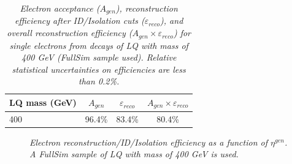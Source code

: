 %
\begin{table}[htb]
  \label{tab:ElecEffAcc}
  \begin{center}
    \begin{tabular}{|l|c|c|c|} \hline
      LQ mass (GeV) & $A_{gen}$ & $\varepsilon_{reco}$ & $A_{gen} \times \varepsilon_{reco}$\\ \hline
      400 & 96.4\% & 83.4\% & 80.4\% \\ \hline
    \end{tabular}
    \caption{\small \sl Electron acceptance ($A_{gen}$), 
      reconstruction efficiency after ID/Isolation cuts ($\varepsilon_{reco}$), and overall reconstruction efficiency 
      ($A_{gen} \times \varepsilon_{reco}$) for single electrons from decays of LQ with mass of 400 GeV (FullSim sample used).   
      Relative statistical uncertainties on efficiencies are less than 0.2\%.  
      } 
  \end{center}
\end{table}
%
\begin{figure}
  \begin{center}
    \caption{\small \sl Electron reconstruction/ID/Isolation efficiency as a function of $\eta^{gen}$. 
      A FullSim sample of LQ with mass of 400 GeV is used.}
    \label{fig:elecEffFV}
  \end{center}
\end{figure}
%



